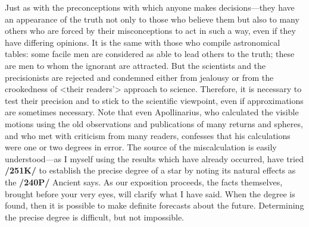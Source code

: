 Just as with the preconceptions with which anyone makes decisions—they have an appearance of the truth not only to those who believe them but also to many others who are forced by their misconceptions
to act in such a way, even if they have differing opinions. It is the same with those who compile astronomical tables: some facile men are considered as able to lead others to the truth; these are men to
whom the ignorant are attracted. But the scientists and the precisionists are rejected and condemned either from jealousy or from the crookedness of <their readers’> approach to science. Therefore, it is necessary to test their precision and to stick to the scientific viewpoint, even if approximations are sometimes necessary. Note that even Apollinarius, who calculated the visible motions using the old observations and publications of many returns and spheres, and who met with criticism from many readers, confesses that his calculations were one or two degrees in error. The source of the miscalculation is easily understood—as I myself using the results which have already occurred, have tried \textbf{/251K/} to establish the precise degree of a
star by noting its natural effects as the \textbf{/240P/} Ancient says. As our exposition proceeds, the facts themselves, brought before your very eyes, will clarify what I have said. When the degree is found, then it
is possible to make definite forecasts about the future. Determining the precise degree is difficult, but not impossible.

\newpage
